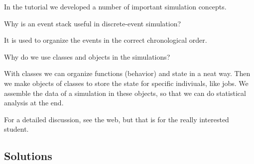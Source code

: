 In the tutorial we developed a number of important simulation concepts.

\begin{exercise}[201904]
Why is  an event stack useful in discrete-event simulation? 
\begin{solution}
  It is used to organize the events in the correct chronological order. 
\end{solution}
\end{exercise}


\begin{exercise}[201904]
  Why do we use classes and objects in the simulations?
\begin{solution}
  With classes we can organize functions (behavior) and state in a neat way.
  Then we make objects of classes to store the state for specific indiviuals, like jobs.
  We assemble the data of a simulation in these objects, so that we can do statistical analysis at the end.

  For a detailed discussion, see the web, but that is for the really interested student.
\end{solution}
\end{exercise}


\subsection*{Solutions}





